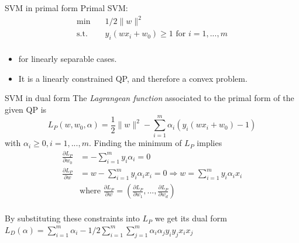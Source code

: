 \documentclass[notes]{beamer}
\begin{document}
\begin{frame}
	{SVM in primal form}
	Primal SVM:
	\begin{equation*}
		\begin{aligned}
			\min \quad          & 1/2 \|w\|^2                               \\
			\mathrm{s.t.} \quad & y_i(wx_i+w_0)\ge 1 \text{ for } i=1,...,m \\
		\end{aligned}
	\end{equation*}
	\begin{itemize}
		\item for linearly separable cases.
		\item It is a linearly constrained QP, and therefore a convex problem.
	\end{itemize}
\end{frame}
\begin{frame}
	{SVM in dual form}
	The \emph{Lagrangean function} associated to the primal form of the given QP is \[
		L_P(w,w_0,\alpha)=\frac{1}{2}\|w\|^2 - \sum_{i=1}^{m} \alpha_i(y_i(wx_i+w_0)-1)
	\]
	with $\alpha_i\ge 0, i =1,...,m$. Finding the minimum of $L_P$ implies
	\begin{equation*}
		\begin{aligned}
			\frac{\partial L_P}{\partial w_0} & =-\sum_{i=1}^{m}y_i\alpha_i=0                                                                                             \\
			\frac{\partial L_P}{\partial w}   & =w-\sum_{i=1}^{m}y_i \alpha_i x_i=0 \Rightarrow w=\sum_{i=1}^{m}y_i \alpha_i x_i                                          \\
			\quad                             & \text{where } \frac{\partial L_P}{\partial w}=(\frac{\partial L_P}{\partial w_1}, ..., \frac{\partial L_P}{\partial w_d}) \\
		\end{aligned}
	\end{equation*}

	By substituting these constraints into $L_P$ we get its dual form
	$L_D(\alpha) = \sum_{i=1}^{m} \alpha_i - 1/2 \sum_{i=1}^{m} \sum_{j=1}^{m} \alpha_i \alpha_j y_i y_j x_i x_j$

\end{frame}
\end{document}
